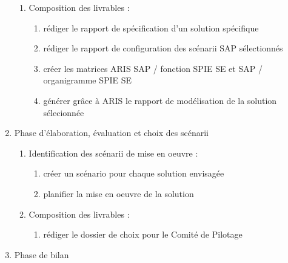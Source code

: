 \begin{enumerate}
\begin{enumerate}
            \item Composition des livrables : 
                \begin{enumerate}
                  \item rédiger le rapport de spécification d'un solution spécifique 
                  \item rédiger le rapport de configuration des scénarii SAP sélectionnés
                  \item créer les matrices ARIS SAP / fonction SPIE SE et SAP / organigramme SPIE SE
                  \item générer grâce à ARIS le rapport de modélisation de la solution sélecionnée
                \end{enumerate}
          \end{enumerate}

    \item Phase d'élaboration, évaluation et choix des scénarii

          \begin{enumerate}
            \item Identification des scénarii de mise en oeuvre : 
                \begin{enumerate}
                  \item créer un scénario pour chaque solution envisagée
                  \item planifier la mise en oeuvre de la solution
                \end{enumerate}
            \item Composition des livrables : 
                \begin{enumerate}
                  \item rédiger le dossier de choix pour le Comité de Pilotage
                \end{enumerate}
          \end{enumerate}

\item Phase de bilan


\end{enumerate}
